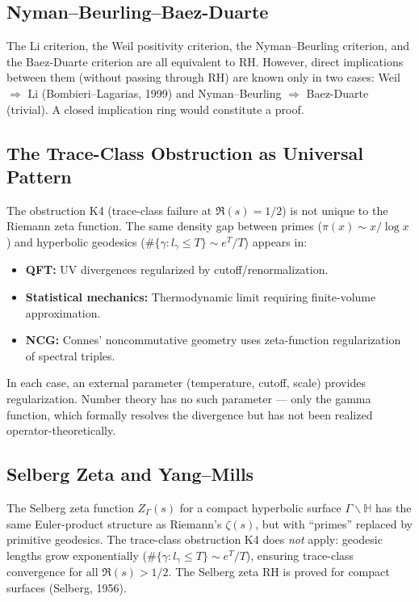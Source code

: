 \documentclass[12pt,a4paper]{article}
\theoremstyle{definition}
\theoremstyle{remark}
\begin{document}
\subsection{Nyman--Beurling--Baez-Duarte}

The Li criterion, the Weil positivity criterion, the Nyman--Beurling criterion, and the Baez-Duarte criterion are all equivalent to RH. However, direct implications between them (without passing through RH) are known only in two cases: Weil $\Rightarrow$ Li (Bombieri--Lagarias, 1999) and Nyman--Beurling $\Rightarrow$ Baez-Duarte (trivial). A closed implication ring would constitute a proof.

\subsection{The Trace-Class Obstruction as Universal Pattern}

The obstruction K4 (trace-class failure at $\Re(s) = 1/2$) is not unique to the Riemann zeta function. The same density gap between primes ($\pi(x) \sim x/\log x$) and hyperbolic geodesics ($\#\{\gamma: l_\gamma \leq T\} \sim e^T/T$) appears in:
\begin{itemize}
  \item \textbf{QFT:} UV divergences regularized by cutoff/renormalization.
  \item \textbf{Statistical mechanics:} Thermodynamic limit requiring finite-volume approximation.
  \item \textbf{NCG:} Connes' noncommutative geometry uses zeta-function regularization of spectral triples.
\end{itemize}
In each case, an external parameter (temperature, cutoff, scale) provides regularization. Number theory has no such parameter --- only the gamma function, which formally resolves the divergence but has not been realized operator-theoretically.

\subsection{Selberg Zeta and Yang--Mills}

The Selberg zeta function $Z_\Gamma(s)$ for a compact hyperbolic surface $\Gamma \backslash \mathbb{H}$ has the same Euler-product structure as Riemann's $\zeta(s)$, but with ``primes'' replaced by primitive geodesics. The trace-class obstruction K4 does \emph{not} apply: geodesic lengths grow exponentially ($\#\{\gamma: l_\gamma \leq T\} \sim e^T/T$), ensuring trace-class convergence for all $\Re(s) > 1/2$. The Selberg zeta RH is proved for compact surfaces (Selberg, 1956).
\end{document}
